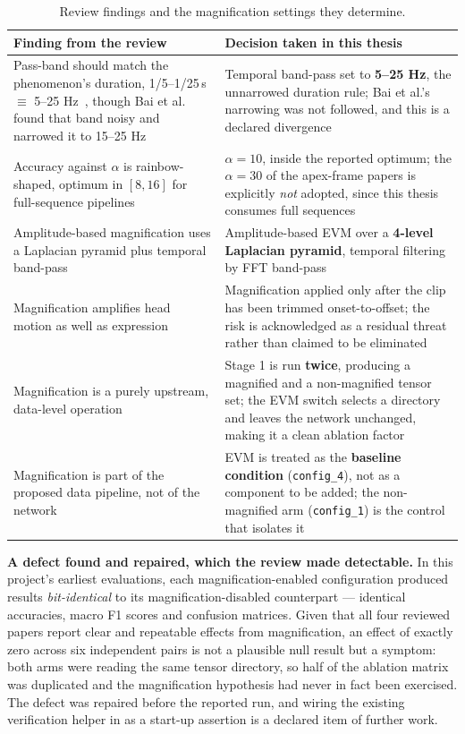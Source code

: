 \begin{table}[htbp]
	\centering
	\footnotesize
	\begin{tabular}{@{}p{6.4cm} p{7.4cm}@{}}
		\hline
		\textbf{Finding from the review} & \textbf{Decision taken in this thesis} \\
		\hline
		Pass-band should match the phenomenon's duration, 1/5--1/25\,s $\equiv$ 5--25 Hz~\cite{bai2021}, though Bai et al. found that band noisy and narrowed it to 15--25 Hz & Temporal band-pass set to \textbf{5--25 Hz}, the unnarrowed duration rule; Bai et al.'s narrowing was not followed, and this is a declared divergence \\
		Accuracy against $\alpha$ is rainbow-shaped, optimum in \textbf{$[8, 16]$} for full-sequence pipelines~\cite{liX2018} & \textbf{$\alpha = 10$}, inside the reported optimum; the $\alpha = 30$ of the apex-frame papers is explicitly \textit{not} adopted, since this thesis consumes full sequences \\
		Amplitude-based magnification uses a Laplacian pyramid plus temporal band-pass~\cite{bai2021} & Amplitude-based EVM over a \textbf{4-level Laplacian pyramid}, temporal filtering by FFT band-pass \\
		Magnification amplifies head motion as well as expression~\cite{liX2018} & Magnification applied only after the clip has been trimmed onset-to-offset; the risk is acknowledged as a residual threat rather than claimed to be eliminated \\
		Magnification is a purely upstream, data-level operation & Stage 1 is run \textbf{twice}, producing a magnified and a non-magnified tensor set; the EVM switch selects a directory and leaves the network unchanged, making it a clean ablation factor \\
		Magnification is part of the proposed data pipeline, not of the network & EVM is treated as the \textbf{baseline condition} (\texttt{config\_4}), not as a component to be added; the non-magnified arm (\texttt{config\_1}) is the control that isolates it \\
		\hline
	\end{tabular}
	\caption[Review findings and the magnification settings they determine]{Review findings and the magnification settings they determine.}
	\label{tab:evm-settings}
\end{table}

\textbf{A defect found and repaired, which the review made detectable.} In this project's earliest evaluations, each magnification-enabled configuration produced results \textit{bit-identical} to its magnification-disabled counterpart --- identical accuracies, macro F1 scores and confusion matrices. Given that all four reviewed papers report clear and repeatable effects from magnification, an effect of exactly zero across six independent pairs is not a plausible null result but a symptom: both arms were reading the same tensor directory, so half of the ablation matrix was duplicated and the magnification hypothesis had never in fact been exercised. The defect was repaired before the reported run, and wiring the existing verification helper in as a start-up assertion is a declared item of further work.

